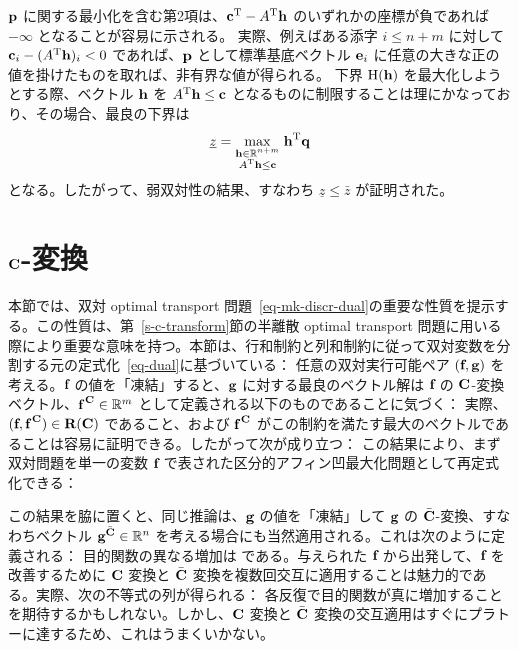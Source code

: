 \begin{rem}
$$$$
$\p$ に関する最小化を含む第2項は、$\transp{\cc}- \transp{A}\hD$ のいずれかの座標が負であれば $-\infty$ となることが容易に示される。
実際、例えばある添字 $i\leq n+m$ に対して $\cc_i-(\transp{A}\hD)_i<0$ であれば、$\p$ として標準基底ベクトル $\e_i$ に任意の大きな正の値を掛けたものを取れば、非有界な値が得られる。
下界 $\LagrangeMKD(\hD)$ を最大化しようとする際、ベクトル $\hD$ を $\transp{A}\hD\leq \cc$ となるものに制限することは理にかなっており、その場合、最良の下界は $$\underline{z}=	\umax{\substack{\hD \in \RR^{n+m}\\\transp{A}\hD \leq \cc}}\transp{\hD}\q$$ となる。したがって、弱双対性の結果、すなわち $\underline{z}\leq \bar{z}$ が証明された。
\end{rem}


\section{$\C$-変換}\label{sec-c-transforms} 本節では、双対 optimal transport 問題~\eqref{eq-mk-discr-dual}の重要な性質を提示する。この性質は、第~\ref{s-c-transform}節の半離散 optimal transport 問題に用いる際により重要な意味を持つ。本節は、行和制約と列和制約に従って双対変数を分割する元の定式化~\eqref{eq-dual}に基づいている：
任意の双対実行可能ペア $(\fD,\gD)$ を考える。$\fD$ の値を「凍結」すると、$\gD$ に対する最良のベクトル解は $\fD$ の $\C$-変換ベクトル、$\fD^{\,\C}\in\RR^m$ として定義される以下のものであることに気づく：
実際、$(\fD,\fD^{\,\C})\in\PotentialsD(\C)$ であること、および $\fD^{\,\C}$ がこの制約を満たす最大のベクトルであることは容易に証明できる。したがって次が成り立つ：
この結果により、まず双対問題を単一の変数 $\fD$ で表された区分的アフィン凹最大化問題として再定式化できる：

この結果を脇に置くと、同じ推論は、$\gD$ の値を「凍結」して $\gD$ の $\bar{\C}$-変換、すなわちベクトル $\gD^{\bar{\C}}\in\RR^n$ を考える場合にも当然適用される。これは次のように定義される：
目的関数の異なる増加は
である。与えられた $\fD$ から出発して、$\fD$ を改善するために $\C$ 変換と $\bar{\C}$ 変換を複数回交互に適用することは魅力的である。実際、次の不等式の列が得られる：
\eq{
	\dotp{\fD}{\a} + \dotp{\fD^{\,\C}}{\b} \leq \dotp{\fD^{\,\C\bar{\C}}}{\a} + \dotp{\fD^{\,\C}}{\b}\leq  \dotp{\fD^{\,\C\bar{\C}}}{\a} + \dotp{\fD^{\,\C\bar{\C}\C}}{\b}\leq  \dots
}
各反復で目的関数が真に増加することを期待するかもしれない。しかし、$\C$ 変換と $\bar{\C}$ 変換の交互適用はすぐにプラトーに達するため、これはうまくいかない。

